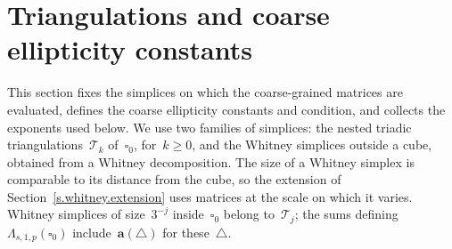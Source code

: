 \documentclass[11pt,letterpaper]{article}
\numberwithin{equation}{section}
\theoremstyle{definition}
\renewcommand{\a}{\mathbf{a}}
\newcommand{\cu}{\square}
\begin{document}
\section{Triangulations and coarse ellipticity constants}
\label{s.triadic.simplices}

This section fixes the simplices on which the coarse-grained matrices are evaluated, defines the coarse ellipticity constants and condition, and collects the exponents used below. We use two families of simplices: the nested triadic triangulations~$\mathscr T_k$ of~$\cu_0$, for~$k\geq0$, and the Whitney simplices outside a cube, obtained from a Whitney decomposition. The size of a Whitney simplex is comparable to its distance from the cube, so the extension of Section~\ref{s.whitney.extension} uses matrices at the scale on which it varies. Whitney simplices of size~$3^{-j}$ inside~$\cu_0$ belong to~$\mathscr T_j$; the sums defining~$\Lambda_{s,1,p}(\cu_0)$ include~$\a(\triangle)$ for these~$\triangle$.
\end{document}
